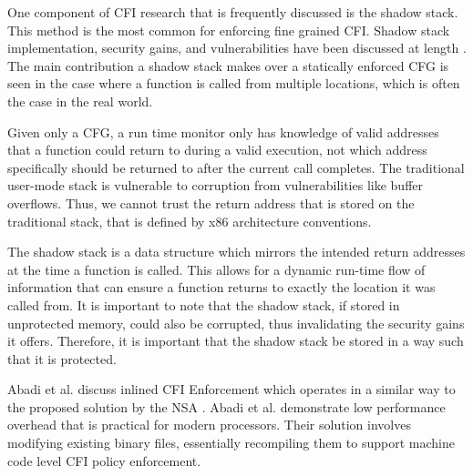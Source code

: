 \documentclass[conference,compsoc]{IEEEtran}
\begin{document}
One component of CFI research that is frequently discussed is the shadow stack. This method is the most common for enforcing fine grained CFI. Shadow stack implementation, security gains, and vulnerabilities have been discussed at length \cite{abadi,dang,evans,conti,carlini,schwartz}. The main contribution a shadow stack makes over a statically enforced CFG is seen in the case where a function is called from multiple locations, which is often the case in the real world.

Given only a CFG, a run time monitor only has knowledge of valid addresses that a function could return to during a valid execution, not which address specifically should be returned to after the current call completes. The traditional user-mode stack is vulnerable to corruption from vulnerabilities like buffer overflows. Thus, we cannot trust the return address that is stored on the traditional stack, that is defined by x86 architecture conventions.
%
%
%
%
%
%

The shadow stack is a data structure which mirrors the intended return addresses at the time a function is called. This allows for a dynamic run-time flow of information that can ensure a function returns to exactly the location it was called from. It is important to note that the shadow stack, if stored in unprotected memory, could also be corrupted, thus invalidating the security gains it offers. Therefore, it is important that the shadow stack be stored in a way such that it is protected.

Abadi et al. discuss inlined CFI Enforcement \cite{abadi} which operates in a similar way to the proposed solution by the NSA \cite{NSAGitHub}. Abadi et al. demonstrate low performance overhead that is practical for modern processors. Their solution involves modifying existing binary files, essentially recompiling them to support machine code level CFI policy enforcement. 
\end{document}
